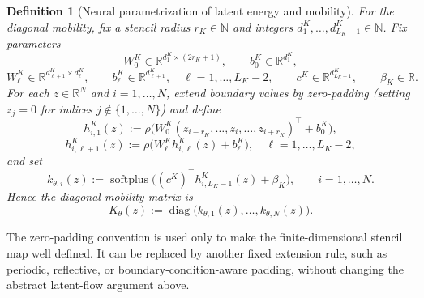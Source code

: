 \documentclass[11pt]{article}
\newtheorem{definition}{Definition}
\newcommand{\N}{\mathbb{N}}
\newcommand{\R}{\mathbb{R}}
\newcommand{\diag}{\operatorname{diag}}
\newcommand{\softplus}{\operatorname{softplus}}
\begin{document}
\begin{definition}[Neural parametrization of latent energy and mobility]
For the diagonal mobility, fix a stencil radius \(r_K\in \N\) and integers \(d_1^K,\dots,d_{L_K-1}^K\in \N\). Fix parameters
\begin{equation}\label{eq:K-params}
W_0^K\in \R^{d_1^K\times (2r_K+1)}, \qquad b_0^K\in \R^{d_1^K},
\end{equation}
\begin{equation*}
W_{\ell}^K\in \R^{d_{\ell+1}^K\times d_{\ell}^K}, \qquad b_{\ell}^K\in \R^{d_{\ell+1}^K}, \quad \ell=1,\dots,L_K-2,
\qquad c^K\in \R^{d_{L_K-1}^K}, \qquad \beta_K\in \R.
\end{equation*}
For each \(z\in\R^N\) and \(i=1,\dots,N\), extend boundary values by zero-padding (setting \(z_j=0\) for indices \(j\notin\{1,\dots,N\}\)) and define
\begin{equation}\label{eq:K-hidden}
h_{i,1}^K(z):=\rho\bigl(W_0^K(z_{i-r_K},\dots,z_i,\dots,z_{i+r_K})^\top+b_0^K\bigr),
\end{equation}
\begin{equation*}
h_{i,\ell+1}^K(z):=\rho\bigl(W_{\ell}^K h_{i,\ell}^K(z)+b_{\ell}^K\bigr), \quad \ell=1,\dots,L_K-2,
\end{equation*}
and set
\begin{equation}\label{eq:k-param}
k_{\theta,i}(z):=\softplus\bigl((c^K)^\top h_{i,L_K-1}^K(z)+\beta_K\bigr), \qquad i=1,\dots,N.
\end{equation}
Hence the diagonal mobility matrix is
\begin{equation}\label{eq:K-matrix}
K_{\theta}(z):=\diag\bigl(k_{\theta,1}(z),\dots,k_{\theta,N}(z)\bigr).
\end{equation}
\end{definition}

The zero-padding convention is used only to make the finite-dimensional stencil map well defined. It can be replaced by another fixed extension rule, such as periodic, reflective, or boundary-condition-aware padding, without changing the abstract latent-flow argument above.
\end{document}

